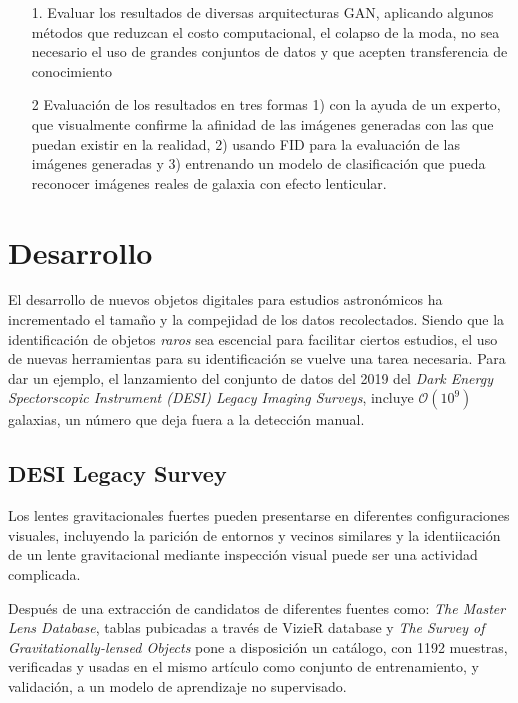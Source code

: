 \documentclass[letterpaper,12pt,oneside]{book}
\begin{document}
            \begin{itemize}
                \item[1.]Evaluar los resultados de diversas arquitecturas GAN, aplicando algunos métodos que reduzcan el costo computacional, el colapso de la moda, no sea necesario el uso de grandes conjuntos de datos y que acepten transferencia de conocimiento
                \item[2] Evaluación de los resultados en tres formas 1) con la ayuda de un experto, que visualmente confirme la afinidad de las imágenes generadas con las que puedan existir en la realidad, 2) usando FID para la evaluación de las imágenes generadas y 3) entrenando un modelo de clasificación que pueda reconocer imágenes reales de galaxia con efecto lenticular.  
            \end{itemize}
            
            


            
            
        \chapter{Desarrollo}
            El desarrollo de nuevos objetos digitales para estudios astronómicos ha incrementado el tamaño y la compejidad de los datos recolectados. Siendo que la identificación de objetos {\it raros} sea escencial para facilitar ciertos estudios, el uso de nuevas herramientas para su identificación se vuelve una tarea necesaria. Para dar un ejemplo, el lanzamiento del conjunto de datos del 2019 del {\it Dark Energy Spectorscopic Instrument (DESI) Legacy Imaging Surveys}, incluye $\mathcal{O}(10^9)$ galaxias, un número que deja fuera a la detección manual. 



            \section{DESI Legacy Survey}
                Los lentes gravitacionales fuertes pueden presentarse en diferentes configuraciones visuales, incluyendo la parición de entornos y vecinos similares y la identiicación de un lente gravitacional mediante inspección visual puede ser una actividad complicada. 

                Después de una extracción de candidatos de diferentes fuentes como: {\it The Master Lens Database}, tablas pubicadas a través de VizieR database y {\it The Survey of Gravitationally-lensed Objects} \cite{stein2022mining} pone a disposición un catálogo, con 1192 muestras, verificadas y usadas en el mismo artículo como conjunto de entrenamiento, y validación, a un modelo de aprendizaje no supervisado. 
\end{document}
